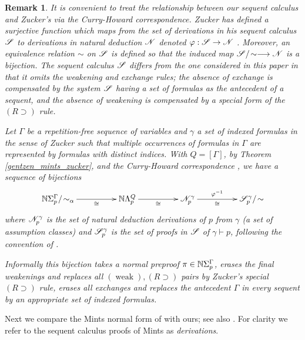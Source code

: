 \documentclass[english,letter paper,12pt,leqno]{article}
\theoremstyle{example}
\newtheorem{remark}[theorem]{Remark}
\numberwithin{equation}{section}
\def\be{\begin{equation}}
\def\ee{\end{equation}}
\def\imp{\supset}
\begin{document}
\begin{remark}\label{opencurryhoward}
It is convenient to treat the relationship between our sequent calculus and Zucker's via the Curry-Howard correspondence. Zucker has defined a surjective function which maps from the set of derivations in his sequent calculus $\mathscr{S}$ \cite[\S 2.2]{zucker} to derivations in natural deduction $\mathscr{N}$ \cite[\S 2.3]{zucker} denoted $\varphi: \mathscr{S} \to \mathscr{N}$ \cite[\S 2.4]{zucker}. Moreover, an equivalence relation $\sim$ on $\mathscr{S}$ is defined \cite[\S 4.1.2]{zucker} so that the induced map $\mathscr{S}/\!\sim \longrightarrow \mathscr{N}$ is a bijection. 
The sequent calculus $\mathscr{S}$ differs from the one considered in this paper in that it omits the weakening and exchange rules; the absence of exchange is compensated by the system $\mathscr{S}$ having a set of formulas as the antecedent of a sequent, and the absence of weakening is compensated by a special form of the $(R \imp)$ rule.

Let $\Gamma$ be a repetition-free sequence of variables and $\gamma$ a set of indexed formulas in the sense of Zucker \cite[\S 2.2.2]{zucker} such that multiple occurrences of formulas in $\Gamma$ are represented by formulas with distinct indices. With $Q = [\Gamma]$, by Theorem \ref{gentzen_mints_zucker}, \cite[Theorem 1]{zucker} and the Curry-Howard correspondence \cite[\S 6.5]{selinger}, we have a sequence of bijections
\be
\xymatrix@C+2pc{
\mathbb{N} \Sigma^\Gamma_p/\!\sim_\alpha \ar[r]_-{\cong} & \mathbb{N} \Lambda^Q_p \ar[r]_-{\cong} & \scr{N}^{\gamma}_p \ar[r]^-{\varphi^{-1}}_-{\cong} & \scr{S}^{\gamma}_p/\!\sim
}
\ee
where $\mathscr{N}^{\gamma}_p$ is the set of natural deduction derivations of $p$ from $\gamma$ (a set of assumption classes) and $\mathscr{S}^{\gamma}_p$ is the set of proofs in $\mathscr{S}$ of $\gamma \vdash p$, following the convention of \cite[\S 2.4.1]{zucker}.

Informally this bijection takes a normal preproof $\pi \in \mathbb{N}\Sigma_p^\Gamma$, erases the final weakenings and replaces all $(\operatorname{weak}),(R\imp)$ pairs by Zucker's special $(R \imp)$ rule, erases all exchanges and replaces the antecedent $\Gamma$ in every sequent by an appropriate set of indexed formulas.
\end{remark}

Next we compare the Mints normal form of \cite{mints} with ours; see also \cite{troelstra_margin}. For clarity we refer to the sequent calculus proofs of Mints as \emph{derivations}.
\end{document}
